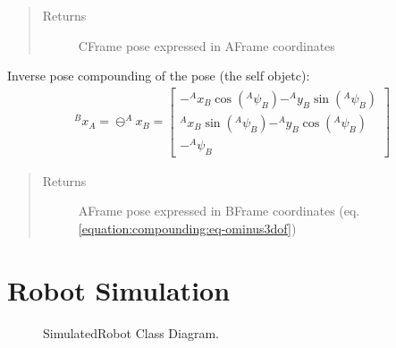 \documentclass[letterpaper,10pt,english]{sphinxmanual}
\begin{document}
\begin{fulllineitems}
\begin{fulllineitems}
\begin{quote}
\begin{description}
\item[{Returns}] \leavevmode
\sphinxAtStartPar
C\sphinxhyphen{}Frame pose expressed in A\sphinxhyphen{}Frame coordinates

\end{description}\end{quote}

\end{fulllineitems}


\begin{fulllineitems}
\label{\detokenize{compounding:Pose3D.Pose3D.ominus}}
\sphinxAtStartPar
Inverse pose compounding of the  pose (the self objetc):
\begin{equation}\label{equation:compounding:eq-ominus3dof}
\begin{split}^Bx_A = \ominus ^Ax_B =
\begin{bmatrix}
    -^Ax_B \cos(^A\psi_B) - ^Ay_B \sin(^A\psi_B) \\
    ^Ax_B \sin(^A\psi_B) - ^Ay_B \cos(^A\psi_B) \\
    -^A\psi_B
\end{bmatrix}\end{split}
\end{equation}\begin{quote}\begin{description}
\item[{Returns}] \leavevmode
\sphinxAtStartPar
A\sphinxhyphen{}Frame pose expressed in B\sphinxhyphen{}Frame coordinates (eq. \eqref{equation:compounding:eq-ominus3dof})

\end{description}\end{quote}

\end{fulllineitems}


\end{fulllineitems}



\section{Robot Simulation}
\label{\detokenize{robot_simulation:robot-simulation}}\label{\detokenize{robot_simulation::doc}}
\begin{figure}[htbp]
\centering
\capstart

\noindent{}
\caption{SimulatedRobot Class Diagram.}\label{\detokenize{robot_simulation:id1}}\end{figure}
\end{document}
